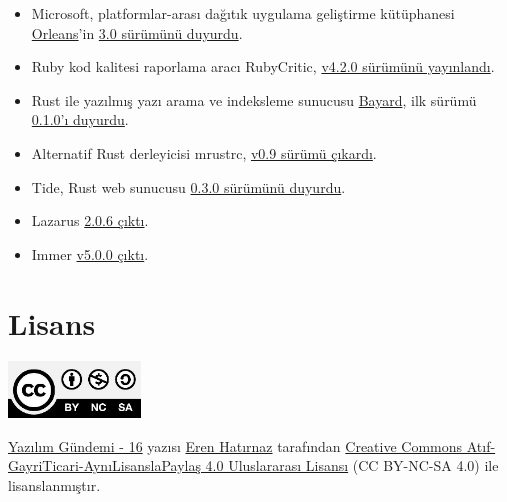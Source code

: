 \documentclass[11pt]{article}
\begin{document}
\begin{itemize}
\item Microsoft, platformlar-arası dağıtık uygulama geliştirme kütüphanesi
\href{https://github.com/dotnet/orleans}{Orleans}'in \href{https://devblogs.microsoft.com/dotnet/orleans-3-0/}{3.0 sürümünü duyurdu}.
\item Ruby kod kalitesi raporlama aracı RubyCritic, \href{https://www.fastruby.io/blog/code-quality/code-coverage/rubycritic-4-2-0-simplecov-support.html}{v4.2.0 sürümünü yayınlandı}.
\item Rust ile yazılmış yazı arama ve indeksleme sunucusu \href{https://github.com/mosuka/bayard}{Bayard}, ilk sürümü
\href{https://github.com/mosuka/bayard/releases/tag/v0.1.0}{0.1.0'ı duyurdu}.
\item Alternatif Rust derleyicisi mrustrc, \href{https://github.com/thepowersgang/mrustc/releases/tag/v0.9}{v0.9 sürümü çıkardı}.
\item Tide, Rust web sunucusu \href{https://github.com/http-rs/tide/releases/tag/0.3.0}{0.3.0 sürümünü duyurdu}.
\item Lazarus \href{https://forum.lazarus.freepascal.org/index.php/topic,47269.0.html}{2.0.6 çıktı}.
\item Immer \href{https://github.com/immerjs/immer}{v5.0.0 çıktı}.
\end{itemize}
\section{Lisans}
\label{sec:org96dcc63}
\begin{center}
\begin{center}
\includegraphics[height=1.5cm]{../../../img/CC_BY-NC-SA_4.0.png}
\end{center}

\href{yazilim-gundemi-16.pdf}{Yazılım Gündemi - 16} yazısı \href{https://erenhatirnaz.github.io}{Eren Hatırnaz} tarafından \href{http://creativecommons.org/licenses/by-nc-sa/4.0/}{Creative Commons
Atıf-GayriTicari-AynıLisanslaPaylaş 4.0 Uluslararası Lisansı} (CC BY-NC-SA 4.0)
ile lisanslanmıştır.
\end{center}
\end{document}
